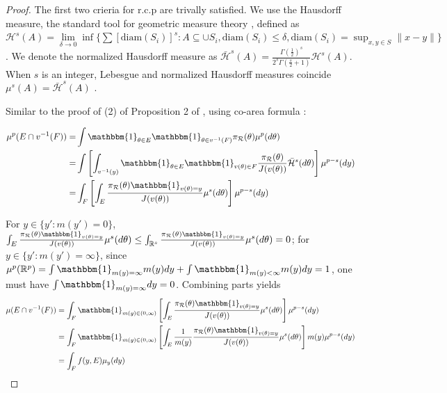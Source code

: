 \documentclass[10pt,fleqn]{article}
\newcommand{\be}{\begin{equation}\begin{aligned}}
\newcommand{\ee}{\end{aligned}\end{equation}}
\newcommand{\bb}[1]{\mathbb{#1}}
\newcommand{\mc}[1]{\mathcal{#1}}
\DeclareMathOperator{\1}{\mathbbm{1}}
\begin{document}
\begin{proof} The first two crieria for r.c.p are trivally satisfied. We
use the Hausdorff measure, the standard tool for geometric measure theory \citep{federer2014geometric}, defined as $\mc H^{s}(A)= \underset{\delta\rightarrow 0}\lim \inf \{ \sum \left[{\text{diam}(S_i)}\right]^s: {A\subseteq \cup S_i, \text{diam}(S_i)\le \delta}, \text{diam}(S_i)=\sup_{x,y\in S}\|x-y\|\}$. We denote the normalized Hausdorff measure as $\bar{\mc H}^{s}(A) =\frac{\Gamma(\frac{1}{2})^{s}}{2^s \Gamma(\frac{s}{2}+1)} \mc H^{s}(A)$. When $s$ is an integer, Lebesgue and normalized Hausdorff measures coincide  $\mu^{s}(A)= \bar{\mc H}^{s}(A)$ \citep{evans2015measure}.

Similar to the proof of (2) of Proposition 2 of \cite{diaconis2013manifold}, using co-area formula \citep{federer2014geometric}:

\be
\mu^{p}(E\cap v^{-1}(F))= & \int \mathbbm{1}_{\theta \in E} \mathbbm{1}_{\theta \in v^{-1}(F)}\pi_{\mc R}(\theta)\mu^p(d\theta) \\
= & \int \left[ \int_{v^{-1}(y)} \mathbbm{1}_{\theta \in E} \mathbbm{1}_{v(\theta) \in F}  \frac{ \pi_{\mc R}(\theta)}{J(v(\theta))} \bar{\mc H}^{s}(d\theta)\right] \mu^{p-s}(dy) \\
= & \int_{F} \left [ \int_{ E}  \frac{ \pi_{\mc R}(\theta) \mathbbm{1}_{v(\theta)=y}}{J(v(\theta))} \mu^{s}(d\theta)  \right] \mu^{p-s}(dy) \\
\ee


For $y\in \{y':m(y')=0\}$, $\int_{ E}  \frac{ \pi_{\mc R}(\theta) \mathbbm{1}_{v(\theta)=y}}{J(v(\theta))} \mu^s(d\theta) \le \int_{ \bb R^{s}}  \frac{ \pi_{\mc R}(\theta) \mathbbm{1}_{v(\theta)=y}}{J(v(\theta))} \mu^s(d\theta) =0$; for $y\in \{y':m(y')=\infty\}$, since $\mu ^{p}(\bb R^p)=\int \mathbbm{1}_{m(y)=\infty}m(y) dy + \int  \mathbbm{1}_{m(y)<\infty}m(y)  dy=1$, one must have $\int \mathbbm{1}_{m(y)=\infty} dy=0$. Combining parts yields
\be
\mu(E\cap v^{-1}(F)) & = \int_{F} \mathbbm{1}_{m(y)\in (0,\infty)}\left[
\int_{E} \frac{\pi_{\mc
R}(\theta) \mathbbm{1}_{v({\theta})=y}}{J(v(\theta))}
\mu^{s}(d\theta) \right] \mu^{p-s}(dy) \\
& = \int_{F} \mathbbm{1}_{m(y)\in (0,\infty)}
\left[ \int_{E}  \frac{1}{m(y)}  \frac{\pi_{\mc
R}(\theta) \mathbbm{1}_{v({\theta})=y}}{J(v(\theta))}
\mu^{s}(d\theta) \right ]  m(y)\mu^{p-s}(dy)\\
& =\int_F f(y,E) \mu_y(dy) 
\ee

\end{proof}
\end{document}
